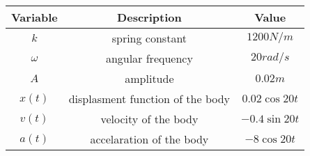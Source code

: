 \begin{tabular}[12.1pt]{ |c| c| c|}
    \hline
    \textbf{Variable} & \textbf{Description} &\textbf{Value}\\ 
    \hline
    $k$ & spring constant & $1200 N/m$ \\
    \hline 
    $\omega$ & angular frequency  & $20 rad/s$ \\
    \hline
    $A$ &amplitude &$0.02 m$\\
    \hline
    $x(t)$ & displasment function of the body & $0.02\cos{20t}$\\
    \hline
   $v(t)$ & velocity of the body & $-0.4\sin{20t}$\\
   \hline
   $a(t)$ & accelaration of the body & $-8\cos{20t}$\\
   \hline
    \end{tabular}
